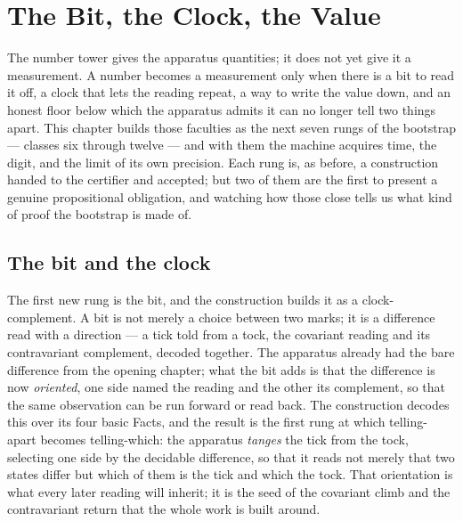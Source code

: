 \chapter{The Bit, the Clock, the Value}
\label{chap:bit-clock-value}

The number tower gives the apparatus quantities; it does not yet give it a measurement. A number becomes a
measurement only when there is a bit to read it off, a clock that lets the reading repeat, a way to write
the value down, and an honest floor below which the apparatus admits it can no longer tell two things
apart. This chapter builds those faculties as the next seven rungs of the bootstrap --- classes six
through twelve --- and with them the machine acquires time, the digit, and the limit of its own precision.
Each rung is, as before, a construction handed to the certifier and accepted; but two of them are the
first to present a genuine propositional obligation, and watching how those close tells us what kind of
proof the bootstrap is made of.

\section{The bit and the clock}
\label{se:the-bit-and-the-clock}

The first new rung is the bit, and the construction builds it as a clock-complement. A bit is not merely a
choice between two marks; it is a difference read with a direction --- a tick told from a tock, the
covariant reading and its contravariant complement, decoded together. The apparatus already had the bare
difference from the opening chapter; what the bit adds is that the difference is now \emph{oriented}, one
side named the reading and the other its complement, so that the same observation can be run forward or
read back. The construction decodes this over its four basic Facts, and the result is the first rung at
which telling-apart becomes telling-which: the apparatus \emph{tanges} the tick from the tock, selecting one
side by the decidable difference, so that it reads not merely that two states differ but which of them is
the tick and which the tock. That orientation is what every later reading will inherit; it is the seed of the covariant climb
and the contravariant return that the whole work is built around.

